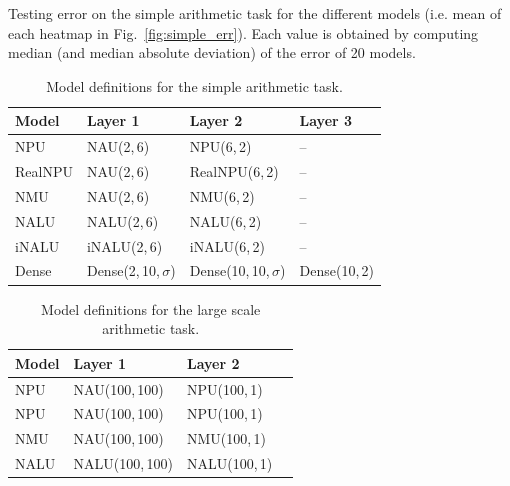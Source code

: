 \documentclass[9pt]{article}
\begin{document}
\begin{table}[h]
  \centering
  \caption{Testing error on the simple arithmetic task for the different models
  (i.e. mean of each heatmap in Fig.~\ref{fig:simple_err}). Each value is
  obtained by computing median (and median absolute deviation) of the error of
  20 models.}
  \label{tab:simple_err}
  \small
  
\end{table}


\begin{table}[h]
  \centering
  \caption{Model definitions for the simple arithmetic task.}
  \label{tab:models_simple_task}
  \begin{tabular}{llll}
    \toprule
    Model & Layer 1 & Layer 2 & Layer 3 \\
    \midrule
    NPU & NAU(2,\,6) & NPU(6,\,2) & -- \\
    RealNPU & NAU(2,\,6) & RealNPU(6,\,2) & -- \\
    NMU & NAU(2,\,6) & NMU(6,\,2) & -- \\
    NALU & NALU(2,\,6) & NALU(6,\,2) & -- \\
    iNALU & iNALU(2,\,6) & iNALU(6,\,2) & -- \\
    Dense & Dense(2,\,10,\,$\sigma$) & Dense(10,\,10,\,$\sigma$) & Dense(10,\,2) \\
    \bottomrule
  \end{tabular}
\end{table}

\begin{table}[h]
  \centering
  \caption{Model definitions for the large scale arithmetic task.}
  \label{tab:models_large_task}
  \begin{tabular}{llll}
    \toprule
    Model & Layer 1 & Layer 2\\
    \midrule
    NPU & NAU(100,\,100) & NPU(100,\,1) \\
    NPU & NAU(100,\,100) & NPU(100,\,1) \\
    NMU & NAU(100,\,100) & NMU(100,\,1) \\
    NALU & NALU(100,\,100) & NALU(100,\,1) \\
    \bottomrule
  \end{tabular}
\end{table}
\end{document}
